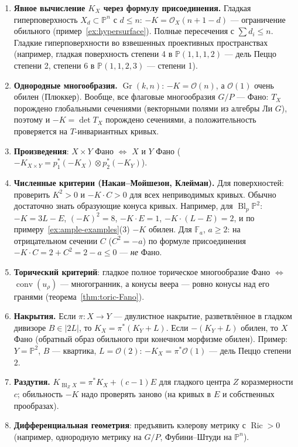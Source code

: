 \documentclass[11pt,a4paper]{article}
\theoremstyle{plain}
\theoremstyle{definition}
\theoremstyle{remark}
\newcommand{\PP}{\mathbb{P}}
\newcommand{\cO}{\mathcal{O}}
\DeclareMathOperator{\Gr}{Gr}
\DeclareMathOperator{\Bl}{Bl}
\DeclareMathOperator{\conv}{conv}
\DeclareMathOperator{\Ric}{Ric}
\begin{document}
\begin{enumerate}
\item \textbf{Явное вычисление $K_X$ через формулу присоединения.} Гладкая гиперповерхность
$X_d\subset\PP^n$ с $d\le n$: $-K=\cO_X(n+1-d)$ --- ограничение обильного (пример~\ref{ex:hypersurface}).
Полные пересечения с $\sum d_i\le n$. Гладкие гиперповерхности во взвешенных проективных
пространствах (например, гладкая поверхность степени 4 в $\PP(1,1,1,2)$ --- дель Пеццо степени 2, степени 6
в $\PP(1,1,2,3)$ --- степени 1).
\item \textbf{Однородные многообразия.} $\Gr(k,n)$: $-K=\cO(n)$, а $\cO(1)$ очень обилен (Плюккер). Вообще,
все флаговые многообразия $G/P$ --- Фано: $T_X$ порождено глобальными сечениями (векторными полями из
алгебры Ли $G$), поэтому и $-K=\det T_X$ порождено сечениями, а положительность проверяется на
$T$-инвариантных кривых.
\item \textbf{Произведения}: $X\times Y$ Фано $\iff$ $X$ и $Y$ Фано
($-K_{X\times Y}=p_1^*(-K_X)\otimes p_2^*(-K_Y)$).
\item \textbf{Численные критерии (Накаи--Мойшезон, Клейман).} Для поверхностей: проверить $K^2>0$ и
$-K\cdot C>0$ для всех неприводимых кривых. Обычно достаточно знать образующие конуса кривых.
Например, для $\Bl_p\PP^2$: $-K=3L-E$, $(-K)^2=8$, $-K\cdot E=1$, $-K\cdot(L-E)=2$, и по
примеру~\ref{ex:ample-examples}(3) $-K$ обилен. Для $\mathbb F_a$, $a\ge2$: на отрицательном сечении
$C$ ($C^2=-a$) по формуле присоединения $-K\cdot C=2+C^2=2-a\le0$ --- \emph{не} Фано.
\item \textbf{Торический критерий}: гладкое полное торическое многообразие Фано $\iff$ $\conv(u_\rho)$ ---
многогранник, а конусы веера --- ровно конусы над его гранями (теорема~\ref{thm:toric-Fano}).
\item \textbf{Накрытия.} Если $\pi\colon X\to Y$ --- двулистное накрытие, разветвлённое в гладком дивизоре
$B\in|2L|$, то $K_X=\pi^*(K_Y+L)$. Если $-(K_Y+L)$ обилен, то $X$ Фано (обратный образ обильного при
конечном морфизме обилен). Пример: $Y=\PP^2$, $B$ --- квартика, $L=\cO(2)$: $-K_X=\pi^*\cO(1)$ ---
дель Пеццо степени $2$.
\item \textbf{Раздутия.} $K_{\Bl_ZX}=\pi^*K_X+(c-1)E$ для гладкого центра $Z$ коразмерности $c$; обильность
$-K$ надо проверять заново (на кривых в $E$ и собственных прообразах).
\item \textbf{Дифференциальная геометрия}: предъявить кэлерову метрику с $\Ric>0$ (например, однородную
метрику на $G/P$, Фубини--Штуди на $\PP^n$).
\end{enumerate}
\end{document}
